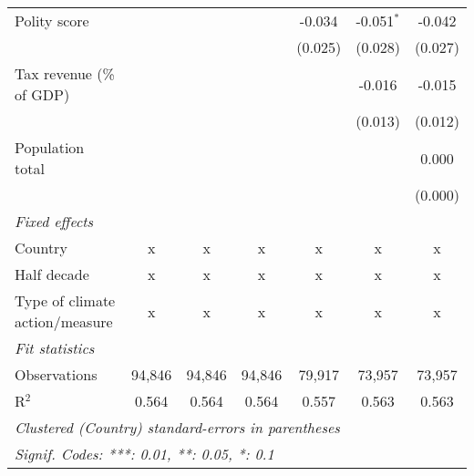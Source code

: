 \begin{tabular}{lcccccc}
   Polity score                                                       &         &               &               & -0.034         & -0.051$^{*}$   & -0.042\\   
                                                                      &         &               &               & (0.025)        & (0.028)        & (0.027)\\   
   Tax revenue (\% of GDP)                                            &         &               &               &                & -0.016         & -0.015\\   
                                                                      &         &               &               &                & (0.013)        & (0.012)\\   
   Population total                                                   &         &               &               &                &                & 0.000\\   
                                                                      &         &               &               &                &                & (0.000)\\   
   \emph{Fixed effects}\\
   Country                                                            & x       & x             & x             & x              & x              & x\\  
   Half decade                                                        & x       & x             & x             & x              & x              & x\\  
   Type of climate action/measure                                     & x       & x             & x             & x              & x              & x\\  
   \midrule \emph{Fit statistics}\\
   Observations                                                       & 94,846  & 94,846        & 94,846        & 79,917         & 73,957         & 73,957\\  
   R$^2$                                                              & 0.564   & 0.564         & 0.564         & 0.557          & 0.563          & 0.563\\  
   \midrule
   \multicolumn{7}{l}{\emph{Clustered (Country) standard-errors in parentheses}}\\
   \multicolumn{7}{l}{\emph{Signif. Codes: ***: 0.01, **: 0.05, *: 0.1}}\\
\end{tabular}
\par\endgroup


